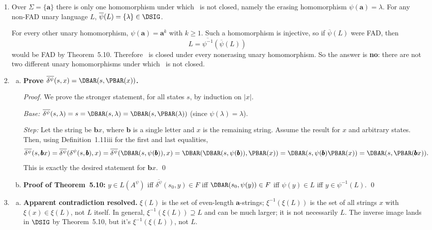 \begin{enumerate}[{5.}1. ]
\item Over $\Sigma=\{\pmb{a}\}$ there is only one homomorphism under which
\NSIG\ is not closed, namely the erasing homomorphism
$\psi(\pmb{a})=\lambda$.  For any non-FAD unary language $L$,
$\overline{\psi}(L)=\{\lambda\}\in\DSIG$.

For every other unary homomorphism, $\psi(\pmb{a})=\pmb{a}^k$ with $k\ge 1$.
Such a homomorphism is injective, so if $\overline{\psi}(L)$ were FAD, then
\[
L=\overline{\psi^{-1}}(\overline{\psi}(L))
\]
would be FAD by Theorem~5.10.  Therefore \NSIG\ is closed under every nonerasing
unary homomorphism.  So the answer is \textbf{no}: there are not two different
unary homomorphisms under which \NSIG\ is not closed.

\item \begin{enumerate}[(a)]
  \item \textbf{Prove $\overline{\delta^\psi}(s,x)=\DBAR(s,\PBAR(x))$.}

  \begin{proof}
  We prove the stronger statement, for all states $s$, by induction on $|x|$.

  \emph{Base:} $\overline{\delta^\psi}(s,\lambda)=s=\DBAR(s,\lambda)=\DBAR(s,\PBAR(\lambda))$ (since $\psi(\lambda)=\lambda$).

  \emph{Step:} Let the string be $\pmb{b}x$, where $\pmb{b}$ is a single letter
  and $x$ is the remaining string. Assume the result for $x$ and arbitrary
  states. Then, using Definition~1.11iii for the first and last equalities,
  \[
  \overline{\delta^\psi}(s,\pmb{b}x)
  =\overline{\delta^\psi}(\delta^\psi(s,\pmb{b}),x)
  =\overline{\delta^\psi}(\DBAR(s,\psi(\pmb{b})),x)
  =\DBAR(\DBAR(s,\psi(\pmb{b})),\PBAR(x))
  =\DBAR(s,\psi(\pmb{b})\PBAR(x))
  =\DBAR(s,\PBAR(\pmb{b}x)).
  \]
  This is exactly the desired statement for $\pmb{b}x$. \qed
  \end{proof}

  \item \textbf{Proof of Theorem~5.10:} $y\in L(A^\psi)$ iff $\overline{\delta^\psi}(s_0,y)\in F$ iff $\DBAR(s_0,\psi(y))\in F$ iff $\psi(y)\in L$ iff $y\in\psi^{-1}(L)$. \qed
\end{enumerate}

\item \begin{enumerate}[(a)]
  \item \textbf{Apparent contradiction resolved.}  $\xi(L)$ is the set of even-length $\pmb{a}$-strings; $\xi^{-1}(\xi(L))$ is the set of all strings $x$ with $\xi(x)\in\xi(L)$, not $L$ itself.  In general, $\xi^{-1}(\xi(L))\supseteq L$ and can be much larger; it is not necessarily $L$.  The inverse image lands in $\DSIG$ by Theorem~5.10, but it's $\xi^{-1}(\xi(L))$, not $L$.


\end{enumerate}
\end{enumerate}
